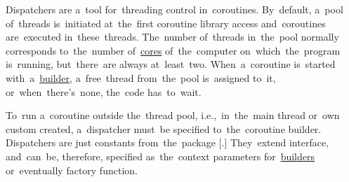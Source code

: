 \label{kotlincoroutinedispatcher}
Dispatchers are a~tool for~threading control in~coroutines.
By~default, a~pool of~threads is~initiated at~the~first coroutine library access and~coroutines are~executed in~these~threads.
The~number of~threads in~the~pool normally corresponds to~the~number of~\hyperref[processorcpucore]{cores} of~the~computer on~which~the~program is~running, but~there~are always at~least~two.
When~a~coroutine is~started with~a~\hyperref[kotlincoroutinebuilder]{builder}, a~free~thread from~the~pool is~assigned to~it, or~when~there's~none, the~code has~to~wait.

To~run a~coroutine outside the~thread pool, i.e.,~in~the~main thread or~own custom created, a~dispatcher must~be specified to~the~coroutine builder.
Dispatchers are just constants from~the~package [.]
They~extend  interface, and~can~be, therefore, specified as~the~context parameters for~\hyperref[kotlincoroutinebuilder]{builders} or~eventually  factory function.

